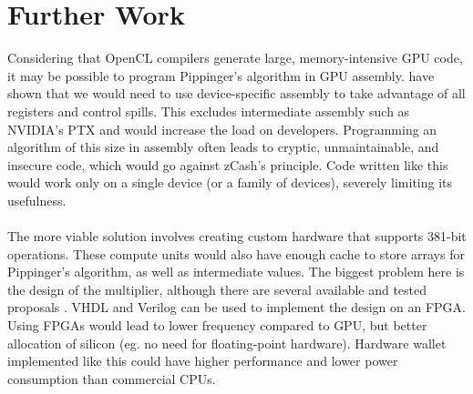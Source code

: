 
\chapter{Further Work} %

\label{Chapter8} %


Considering that OpenCL compilers generate large, memory-intensive GPU code, it may be possible to program Pippinger's algorithm in GPU assembly. \cite{bernstein2010ecc2k} have shown that we would need to use device-specific assembly to take advantage of all registers and control spills. This excludes intermediate assembly such as NVIDIA's PTX and would increase the load on developers. Programming an algorithm of this size in assembly often leads to cryptic, unmaintainable, and insecure code, which would go against zCash's principle. Code written like this would work only on a single device (or a family of devices), severely limiting its usefulness.\\
\\
The more viable solution involves creating custom hardware that supports 381-bit operations. These compute units would also have enough cache to store arrays for Pippinger's algorithm, as well as intermediate values. The biggest problem here is the design of the multiplier, although there are several available and tested proposals \cite{brinci2015efficient, quan2005high}. VHDL and Verilog can be used to implement the design on an FPGA. Using FPGAs would lead to lower frequency compared to GPU, but better allocation of silicon (eg. no need for floating-point hardware). Hardware wallet implemented like this could have higher performance and lower power consumption than commercial CPUs.